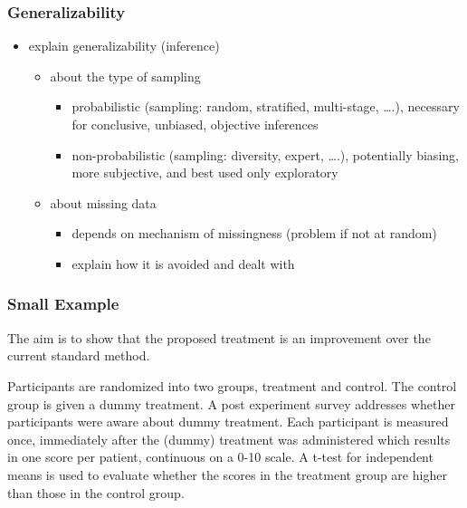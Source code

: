 \documentclass[]{article}
\providecommand{\tightlist}{%
  \setlength{\itemsep}{0pt}\setlength{\parskip}{0pt}}
\begin{document}
\subsubsection{Generalizability}\label{generalizability}

\begin{itemize}
\tightlist
\item
  explain generalizability (inference)

  \begin{itemize}
  \tightlist
  \item
    about the type of sampling

    \begin{itemize}
    \tightlist
    \item
      probabilistic (sampling: random, stratified, multi-stage,
      \ldots{}.), necessary for conclusive, unbiased, objective
      inferences
    \item
      non-probabilistic (sampling: diversity, expert, \ldots{}.),
      potentially biasing, more subjective, and best used only
      exploratory
    \end{itemize}
  \item
    about missing data

    \begin{itemize}
    \tightlist
    \item
      depends on mechanism of missingness (problem if not at random)
    \item
      explain how it is avoided and dealt with
    \end{itemize}
  \end{itemize}
\end{itemize}

\subsubsection{Small Example}\label{small-example}

The aim is to show that the proposed treatment is an improvement over
the current standard method.

Participants are randomized into two groups, treatment and control. The
control group is given a dummy treatment. A post experiment survey
addresses whether participants were aware about dummy treatment. Each
participant is measured once, immediately after the (dummy) treatment
was administered which results in one score per patient, continuous on a
0-10 scale. A t-test for independent means is used to evaluate whether
the scores in the treatment group are higher than those in the control
group.
\end{document}
